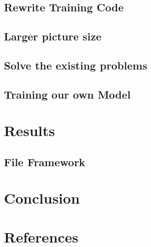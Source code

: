 \documentclass{ctexart}
\begin{document}
\subsection{Rewrite Training Code}

\subsection{Larger picture size}

\subsection{Solve the existing problems}

\subsection{Training our own Model}

\section{Results}

\subsection{File Framework}


\section{Conclusion}

\section{References}
\end{document}
